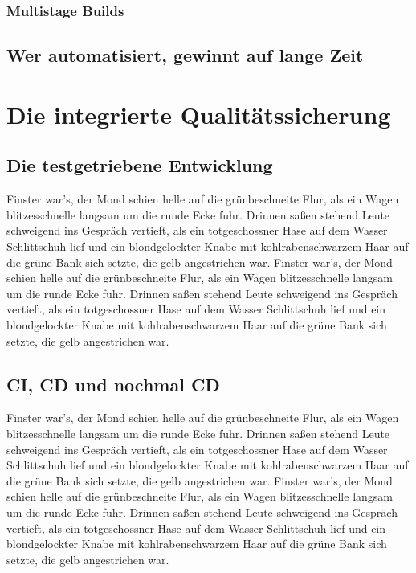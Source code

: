 \subsection{Multistage Builds}

\section{Wer automatisiert, gewinnt auf lange Zeit}

\chapter{Die integrierte Qualitätssicherung}

\section{Die testgetriebene Entwicklung}

Finster war's, der Mond schien helle auf die grünbeschneite Flur, als
ein Wagen blitzesschnelle langsam um die runde Ecke fuhr. Drinnen
saßen stehend Leute schweigend ins Gespräch vertieft, als ein
totgeschossner Hase auf dem Wasser Schlittschuh lief und ein
blondgelockter Knabe mit kohlrabenschwarzem Haar auf die grüne Bank
sich setzte, die gelb angestrichen war.
Finster war's, der Mond schien helle auf die grünbeschneite Flur, als
ein Wagen blitzesschnelle langsam um die runde Ecke fuhr. Drinnen
saßen stehend Leute schweigend ins Gespräch vertieft, als ein
totgeschossner Hase auf dem Wasser Schlittschuh lief und ein
blondgelockter Knabe mit kohlrabenschwarzem Haar auf die grüne Bank
sich setzte, die gelb angestrichen war.

\section{CI, CD und nochmal CD}
\label{sec:ci-cd-und-nochmal-cd}


Finster war's, der Mond schien helle auf die grünbeschneite Flur, als
ein Wagen blitzesschnelle langsam um die runde Ecke fuhr. Drinnen
saßen stehend Leute schweigend ins Gespräch vertieft, als ein
totgeschossner Hase auf dem Wasser Schlittschuh lief und ein
blondgelockter Knabe mit kohlrabenschwarzem Haar auf die grüne Bank
sich setzte, die gelb angestrichen war.
Finster war's, der Mond schien helle auf die grünbeschneite Flur, als
ein Wagen blitzesschnelle langsam um die runde Ecke fuhr. Drinnen
saßen stehend Leute schweigend ins Gespräch vertieft, als ein
totgeschossner Hase auf dem Wasser Schlittschuh lief und ein
blondgelockter Knabe mit kohlrabenschwarzem Haar auf die grüne Bank
sich setzte, die gelb angestrichen war.


